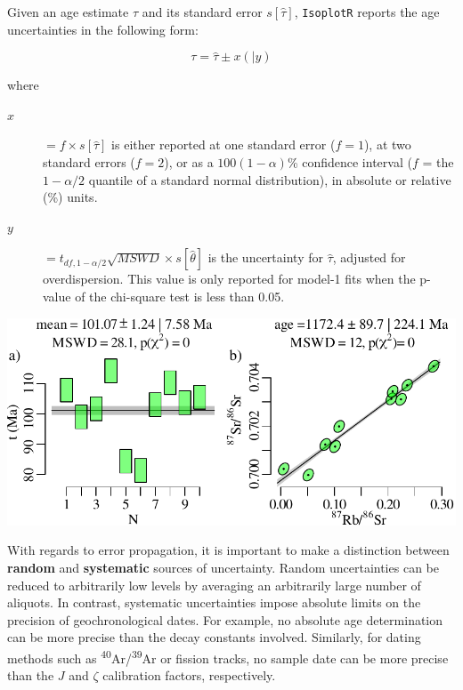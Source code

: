 \begin{refsection}
Given an age estimate $\hat{\tau}$ and its standard error
$s[\hat{\tau}]$, \texttt{IsoplotR} reports the age uncertainties in
the following form:

\[
\tau = \hat{\tau} \pm x (\mid y)
\]

\noindent where

\begin{description}
\item[$x$] $= f \times s[\hat{\tau}]$ is either reported at one
  standard error ($f=1$), at two standard errors ($f=2$), or as a
  $100(1-\alpha)$\% confidence interval ($f$ = the $1-\alpha/2$
  quantile of a standard normal distribution), in absolute or relative
  (\%) units.
\item[$y$] $= t_{df,1-\alpha/2} \sqrt{MSWD} \times s[\hat{\theta}]$ is
  the uncertainty for $\hat{\tau}$, adjusted for overdispersion. This
  value is only reported for model-1 fits when the p-value of the
  chi-square test is less than 0.05.
\end{description}

\noindent\begin{minipage}[t][][b]{.6\textwidth}
  \includegraphics[width=\textwidth]{../figures/model-1.pdf}\\
\end{minipage}
\begin{minipage}[t][][t]{.4\textwidth}
  \label{fig:model-1}
\end{minipage}

With regards to error propagation, it is important to make a
distinction between \textbf{random} and \textbf{systematic} sources of
uncertainty. Random uncertainties can be reduced to arbitrarily low
levels by averaging an arbitrarily large number of aliquots. In
contrast, systematic uncertainties impose absolute limits on the
precision of geochronological dates.  For example, no absolute age
determination can be more precise than the decay constants
involved. Similarly, for dating methods such as
\textsuperscript{40}Ar/\textsuperscript{39}Ar or fission tracks, no
sample date can be more precise than the $J$ and $\zeta$ calibration
factors, respectively.\\


\end{refsection}
